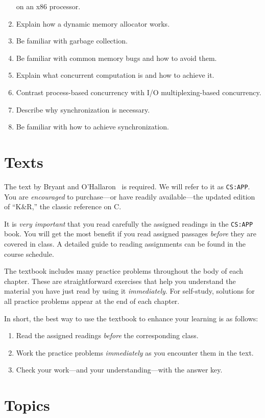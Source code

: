 \documentclass[11pt]{article}
\begin{document}
\begin{enumerate}
  on an x86 processor.
\item Explain how a dynamic memory allocator works.
\item Be familiar with garbage collection.
\item Be familiar with common memory bugs and how to avoid them.
\item Explain what concurrent computation is and how to achieve it.
\item Contrast process-based concurrency with I/O multiplexing-based
  concurrency.
\item Describe why synchronization is necessary.
\item Be familiar with how to achieve synchronization.
\end{enumerate}

\section{Texts}

The text by Bryant and O'Hallaron~\cite{cs:app3} is required.
We will refer to it as \texttt{CS:APP}.
You are \emph{encouraged} to purchase---or have readily available---the
updated edition of ``K\&R,'' the classic reference on C.\cite{k&r}

It is \emph{very important} that you read carefully
the assigned readings in the \texttt{CS:APP} book.
You will get the most benefit if you read assigned passages
\emph{before} they are covered in class.
A detailed guide to reading assignments can be found in the course schedule.

The textbook includes many practice problems throughout the body of each
chapter. These are straightforward exercises that help you understand the
material you have just read by using it \emph{immediately}. For self-study,
solutions for all practice problems appear at the end of each chapter.

In short, the best way to use the textbook to enhance your learning is as
follows:
\begin{enumerate}
\item Read the assigned readings \emph{before} the corresponding class.
\item Work the practice problems \emph{immediately} as you encounter them in
  the text.
\item Check your work—and your understanding—with the answer key.
\end{enumerate}

\section{Topics}
\end{document}

